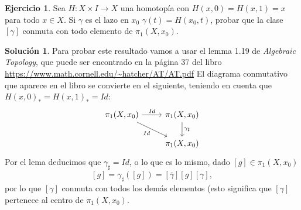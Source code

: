 \documentclass{article}
\theoremstyle{plain}
\theoremstyle{definition}
\newtheorem{exercise}{Ejercicio}
\newtheorem*{sol*}{Solución}
\begin{document}
\newpage \begin{exercise} Sea $H: X\times I \to X$ una homotopía con $H(x,0) =  H(x,1) = x$ para todo $x\in X$. Si $\gamma$ es el lazo en $x_0$ $\gamma(t) = H(x_0,t)$, probar que la clase $[\gamma]$ conmuta con todo elemento de $\pi_1(X,x_0)$.
\end{exercise}
\begin{sol*} 
Para probar este resultado vamos a usar el lemma 1.19 de \emph{Algebraic Topology}, que puede ser encontrado en la página 37 del libro \url{https://www.math.cornell.edu/~hatcher/AT/AT.pdf}
El diagrama conmutativo que aparece en el libro se convierte en el siguiente, teniendo en cuenta que $H(x,0)_*=H(x,1)_*=Id$:
\[
\begin{tikzcd}
\pi_1(X,x_0)\arrow[r,"Id"]\arrow[dr,"Id"'] &\pi_1(X,x_0)\arrow[d,"\gamma_\sharp"]\\
&\pi_1(X,x_0)
\end{tikzcd}
\]
Por el lema deducimos que $\gamma_\sharp=Id$, o lo que es lo mismo, dado $[g]\in\pi_1(X,x_0)$
\[
[g]=\gamma_\sharp([g])=[\overline{\gamma}][g][\gamma],
\]
por lo que $[\gamma]$ conmuta con todos los demás elementos (esto significa que $[\gamma]$ pertenece al centro de $\pi_1(X,x_0)$.
\end{sol*}
\end{document}
